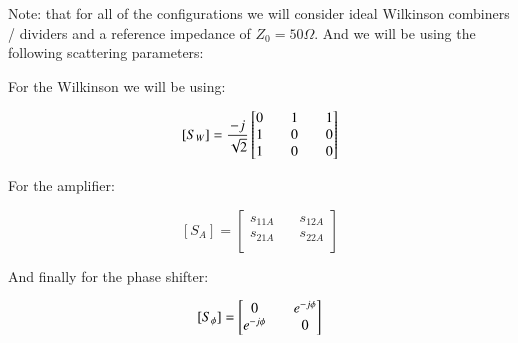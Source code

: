 \documentclass[12pt]{report} %
\begin{document}
Note: that for all of the configurations we will consider ideal Wilkinson combiners / dividers and a reference impedance of $Z_0 = 50 \Omega$. And we will be using the following scattering parameters:

For the Wilkinson we will be using: 

\[
[S_W] = \frac{-j}{\sqrt{2}} \* \begin{bmatrix}
0 & \quad 1 & \quad 1 \\
1 & \quad 0 & \quad 0 \\
1 & \quad 0 & \quad 0 \\
\end{bmatrix}
\]

For the amplifier:

\[
[S_A] = \begin{bmatrix}
s_{11A} & \quad s_{12A} \\
s_{21A} & \quad s_{22A} \\
\end{bmatrix}
\]

And finally for the phase shifter:

\[
[S_{\phi}] = \begin{bmatrix}
0 & \quad e^{-j \* \phi} \\
e^{-j \* \phi} & \quad 0 \\
\end{bmatrix}
\]
\end{document}
